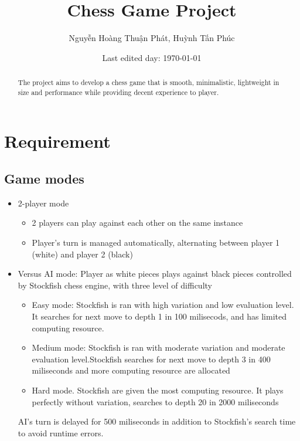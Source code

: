 \documentclass[a4paper, 10pt, titlepage]{report}
\title{Chess Game Project}
\author{Nguyễn Hoàng Thuận Phát, Huỳnh Tấn Phúc}
\date{Last edited day: \selectlanguage{english}\today}
\begin{document}
\maketitle
{}
\renewcommand{\abstractname}{Overview}
\begin{abstract}
  The project aims to develop a chess game that is smooth, minimalistic, lightweight in size and performance while providing decent experience to player.
\end{abstract}

\tableofcontents
\chapter{Requirement}

\section{Game modes}
\begin{itemize}
  \item 2-player mode
        \begin{itemize}
          \item 2 players can play against each other on the same instance
          \item Player's turn is managed automatically, alternating between player 1 (white) and player 2 (black)
        \end{itemize}
  \item Versus AI mode: Player as white pieces plays against black pieces controlled by Stockfish chess engine, with three level of difficulty
        \begin{itemize}
          \item Easy mode: Stockfish is ran with high variation and low evaluation level. It searches for next move to depth 1 in 100 milisecods, and has limited computing resource.
          \item Medium mode: Stockfish is ran with moderate variation and moderate evaluation level.Stockfish searches for next move to depth 3 in 400 miliseconds and more computing resource are allocated
          \item Hard mode. Stockfish are given the most computing resource. It plays perfectly without variation, searches to depth 20 in 2000 miliseconds
        \end{itemize}
        AI's turn is delayed for 500 miliseconds in addition to Stockfish's search time to avoid runtime errors.
\end{itemize}
\end{document}
